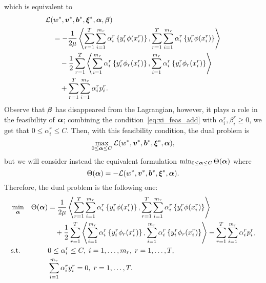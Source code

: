 which is equivalent to 
\begin{equation}
    \nonumber
    \begin{aligned}
        &  \mathcal{L}({{w}}^*, {\bm{v}}^*, {\bm{b}}^*, {\bm{\xi}}^*, \bm{\alpha}, \bm{\beta}) \\
        &\quad = - \frac{1}{2\mu} \bm{\left\langle}  \sum_{r= 1}^T \sum_{i=1}^{m_r} {\alpha_i^r} \left\lbrace y_i^r \phi({x}_i^r) \right\rbrace,  \sum_{r= 1}^T \sum_{i=1}^{m_r} {\alpha_i^r} \left\lbrace y_i^r \phi({x}_i^r) \right\rbrace \bm{\right\rangle} \\
        &\qquad - \frac{1}{2} \sum_{r= 1}^T {\bm{\left\langle} \sum_{i=1}^{m_r} {\alpha_i^r} \left\lbrace y_i^r \phi_r({x}_i^r) \right\rbrace, \sum_{i=1}^{m_r} {\alpha_i^r} \left\lbrace y_i^r \phi_r({x}_i^r) \right\rbrace \bm{\right\rangle}} \\
        &\qquad +  \sum_{r= 1}^T \sum_{i=1}^{m_r} \alpha_i^r  p_{i}^r .
    \end{aligned}
\end{equation}
Observe that $\bm{\beta}$ has disappeared from the Lagrangian, however, it plays a role in the feasibility of $\bm{\alpha}$; combining the condition~\eqref{eq:xi_feas_add} with $\alpha_i^r , \beta_i^r \geq 0$, we get that $0 \leq \alpha_i^r \leq C$.
Then, with this feasibility condition, the dual problem is 
$$ \max_{0 \leq \bm{\alpha} \leq C} \mathcal{L}({{w}}^*, {\bm{v}}^*, {\bm{b}}^*, {\bm{\xi}}^*, \bm{\alpha}),$$
but we will consider instead the equivalent formulation
$\min_{0 \leq \bm{\alpha} \leq C} \Theta(\bm{\alpha})$ where 
$$ \Theta(\bm{\alpha}) = - \mathcal{L}({{w}}^*, {\bm{v}}^*, {\bm{b}}^*, {\bm{\xi}}^*, \bm{\alpha}). $$
Therefore, the dual problem is the following one:
\begin{equation}\label{eq:svmmtl_dual_add}
    \begin{aligned}
    & \min_{\fv{\alpha}} & \Theta(\fv{\alpha}) &=  \frac{1}{2\mu} \dotp{ \sum_{r= 1}^T \sum_{i=1}^{m_r} {\alpha_i^r} \left\lbrace y_i^r \phi({x}_i^r) \right\rbrace}{ \sum_{r= 1}^T \sum_{i=1}^{m_r} {\alpha_i^r} \left\lbrace y_i^r \phi({x}_i^r) \right\rbrace} \\
    & & &\quad + \frac{1}{2} \sum_{r= 1}^T {\dotp{\sum_{i=1}^{m_r} {\alpha_i^r} \left\lbrace y_i^r \phi_r({x}_i^r) \right\rbrace}{\sum_{i=1}^{m_r} {\alpha_i^r} \left\lbrace y_i^r \phi_r({x}_i^r) \right\rbrace}}  - \sum_{r=1}^\ntasks \sum_{i=1}^{\npertask_r} \alpha_i^r p_i^r ,\\
    & \text{s.t.}
    & & 0 \leq \alpha_i^r \leq C , \; i=1, \ldots, \npertask_r,\; r=1, \ldots, \ntasks , \\
    & & & \sum_{i=1}^{m_r} \alpha_i^r y_i^r = 0,\;  r=1, \ldots, \ntasks . \\
    \end{aligned}
\end{equation}
